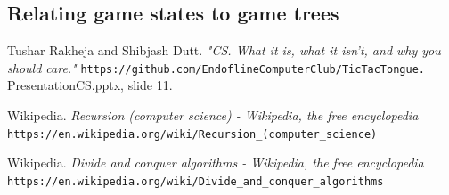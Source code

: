 \documentclass{article}
\begin{document}
\subsection{Relating game states to game trees}

\begin{thebibliography}{9}
 {
Tushar Rakheja and Shibjash Dutt.
\textit{"CS. What it is, what it isn't, and why you should care."}
\texttt{https://github.com/EndoflineComputerClub/TicTacTongue.}
\\PresentationCS.pptx, slide 11. }

Wikipedia.
\textit{Recursion (computer science) - Wikipedia, the free encyclopedia}
\texttt{https://en.wikipedia.org/wiki/Recursion\_(computer\_science)}

Wikipedia.
\textit{Divide and conquer algorithms - Wikipedia, the free encyclopedia}
\texttt{https://en.wikipedia.org/wiki/Divide\_and\_conquer\_algorithms}
\end{thebibliography}
\end{document}
